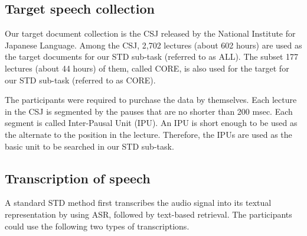 \documentclass[english]{jnlp_1.4}
\begin{document}
\subsection{Target speech collection}

Our target document collection is the CSJ released by the National
Institute for Japanese Language. 
Among the CSJ, 2,702 lectures (about 602 hours) are used as the target
documents for our STD sub-task (referred to as ALL). 
The subset 177 lectures (about 44 hours) of them, called CORE, 
is also used for the target for our STD sub-task (referred to as CORE).

The participants were required to purchase the data by themselves.
Each lecture in the CSJ is segmented by the pauses that are no shorter
than 200 msec. Each segment is called Inter-Pausal Unit (IPU). An IPU is
short enough to be used as the alternate to the position in the lecture.
Therefore, the IPUs are used as the basic unit to be searched in our STD
sub-task.


\subsection{Transcription of speech}

A standard STD method first transcribes the audio signal into its
textual representation by using ASR, followed by text-based
retrieval. The participants could use the following two types of
transcriptions. 
\end{document}
